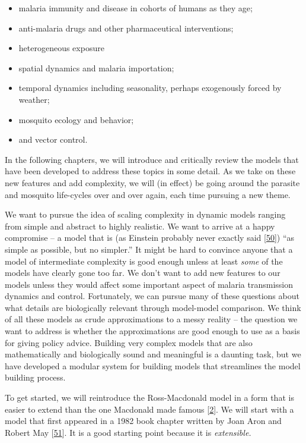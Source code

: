 \documentclass[
]{book}
\begin{document}
\begin{itemize}
\item
  malaria immunity and disease in cohorts of humans as they age;
\item
  anti-malaria drugs and other pharmaceutical interventions;
\item
  heterogeneous exposure
\item
  spatial dynamics and malaria importation;
\item
  temporal dynamics including seasonality, perhaps exogenously forced by weather;
\item
  mosquito ecology and behavior;
\item
  and vector control.
\end{itemize}

In the following chapters, we will introduce and critically review the models that have been developed to address these topics in some detail. As we take on these new features and add complexity, we will (in effect) be going around the parasite and mosquito life-cycles over and over again, each time pursuing a new theme.

We want to pursue the idea of scaling complexity in dynamic models ranging from simple and abstract to highly realistic. We want to arrive at a happy compromise -- a model that is (as Einstein probably never exactly said {[}\protect\hyperlink{ref-RobinsonA2018DidEinstein}{50}{]}) ``as simple as possible, but no simpler.'' It might be hard to convince anyone that a model of intermediate complexity is good enough unless at least \emph{some} of the models have clearly gone too far. We don't want to add new features to our models unless they would affect some important aspect of malaria transmission dynamics and control. Fortunately, we can pursue many of these questions about what details are biologically relevant through model-model comparison. We think of all these models as crude approximations to a messy reality -- the question we want to address is whether the approximations are good enough to use as a basis for giving policy advice. Building very complex models that are also mathematically and biologically sound and meaningful is a daunting task, but we have developed a modular system for building models that streamlines the model building process.

To get started, we will reintroduce the Ross-Macdonald model in a form that is easier to extend than the one Macdonald made famous {[}\protect\hyperlink{ref-SmithDL2012_RossMacdonald}{2}{]}. We will start with a model that first appeared in a 1982 book chapter written by Joan Aron and Robert May {[}\protect\hyperlink{ref-AronJL1982PopulationDynamics}{51}{]}. It is a good starting point because it is \emph{extensible.}
\end{document}
